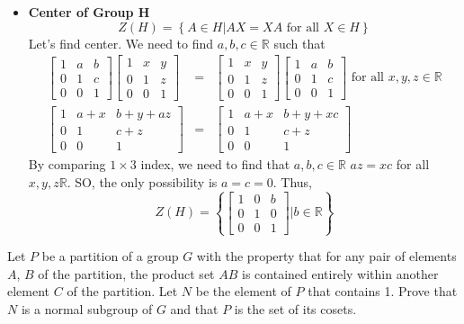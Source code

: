 \documentclass[
]{book}
\providecommand{\tightlist}{%
  \setlength{\itemsep}{0pt}\setlength{\parskip}{0pt}}
\begin{document}
\begin{itemize}
\tightlist
\item
  \textbf{Center of Group H}\\
  \[Z(H)=\left\{A\in H\biggr | AX=XA \text{ for all } X\in H\right\}\]
  Let's find center. We need to find \(a,b,c\in \mathbb{R}\) such that
  \begin{eqnarray}
  \begin{bmatrix} 1 & a & b \\0 & 1 & c\\ 0 & 0  & 1\end{bmatrix}
  \begin{bmatrix} 1 & x & y \\0 & 1 & z\\ 0 & 0  & 1\end{bmatrix}
  &=&
  \begin{bmatrix} 1 & x & y \\0 & 1 & z\\ 0 & 0  & 1\end{bmatrix}
  \begin{bmatrix} 1 & a & b \\0 & 1 & c\\ 0 & 0  & 1\end{bmatrix}
  \text{ for all } x,y,z\in \mathbb{R}\\
  \begin{bmatrix} 1 & a+x & b+y+az \\0 & 1 & c+z\\ 0 & 0  & 1\end{bmatrix}
  &=&
  \begin{bmatrix} 1 & a+x & b+y+xc \\0 & 1 & c+z\\ 0 & 0  & 1\end{bmatrix}
  \end{eqnarray} By comparing \(1 \times 3\) index, we need to find that
  \(a,b,c\in \mathbb{R}\) \(az=xc\) for all \(x,y,z\mathbb{R}\). SO, the
  only possibility is \(a=c=0\). Thus,
  \[Z(H)=\left\{\begin{bmatrix} 1 & 0 & b \\0 & 1 & 0\\ 0 & 0  & 1\end{bmatrix}\Biggr | b\in \mathbb{R}\right\}\]
\end{itemize}

\leavevmode{}%
Let \(P\) be a partition of a group \(G\) with the property that for any
pair of elements \(A\), \(B\) of the partition, the product set \(AB\)
is contained entirely within another element \(C\) of the partition. Let
\(N\) be the element of \(P\) that contains 1. Prove that \(N\) is a
normal subgroup of \(G\) and that \(P\) is the set of its cosets.
\end{document}
